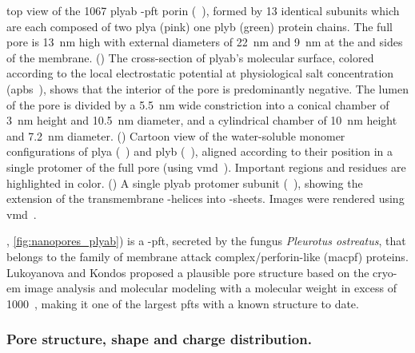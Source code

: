 \begin{figure*}[p]
{  %
  top view of the \SI{1067}{\kDa} \gls{plyab} \tb-\gls{pft} porin
  (~\cite{Lukoyanova-Kondos-2015}), formed by 13 identical subunits which are each composed of two
  \gls{plya} (pink) one \gls{plyb} (green) protein chains. The full pore is \SI{13}{\nm} high with external
  diameters of \SI{22}{\nm} and \SI{9}{\nm} at the \cisi{} and \transi{} sides of the  membrane. 
  ()
  The cross-section of \gls{plyab}'s molecular surface, colored according to the local electrostatic potential
  at physiological salt concentration (\gls{apbs}~\cite{Baker-2001,Baker-2005}), shows that the interior of
  the pore is predominantly negative. The lumen of the pore is divided by a \SI{5.5}{\nm} wide constriction
  into a conical \cisi{} chamber of \SI{3}{\nm} height and \SI{10.5}{\nm} diameter, and a cylindrical
  \transi{} chamber of \SI{10}{\nm} height and \SI{7.2}{\nm} diameter. 
  ()
  Cartoon view of the water-soluble monomer configurations of \gls{plya}
  (~\cite{Lukoyanova-Kondos-2015}) and \gls{plyb} (~\cite{Lukoyanova-Kondos-2015}),
  aligned according to their position in a single protomer of the full pore (using
  \gls{vmd}~\cite{Humphrey-1996}). Important regions and residues are highlighted in color.
  ()
  A single \gls{plyab} protomer subunit (~\cite{Lukoyanova-Kondos-2015}), showing the extension of
  the transmembrane \ta-helices into \tb-sheets.
  Images were rendered using \gls{vmd}~\cite{Humphrey-1996,Stone-1998}.
  }\label{fig:nanopores_plyab}
\end{figure*}

, \cref{fig:nanopores_plyab}) is a \tb-\gls{pft}, secreted by the fungus \textit{Pleurotus
ostreatus}, that belongs to the family of membrane attack complex/perforin-like (\gls{macpf}) proteins.
Lukoyanova and Kondos \etal{} proposed a plausible pore structure based on the \gls{cryo-em} image analysis
and molecular modeling with a molecular weight in excess of \SI{1000}{\kDa}~\cite{Lukoyanova-Kondos-2015},
making it one of the largest \glspl{pft} with a known structure to date.


\subsubsection{Pore structure, shape and charge distribution.}
%

